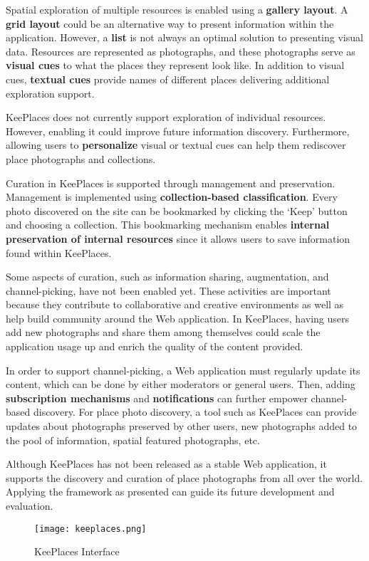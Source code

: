 {Spatial exploration of multiple resources is enabled using a \textbf{gallery layout}. A \textbf{grid layout} could be an alternative way to present information within the application. However, a \textbf{list} is not always an optimal solution to presenting visual data. 
Resources are represented as photographs, and these photographs serve as \textbf{visual cues} to what the places they represent look like. In addition to visual cues, \textbf{textual cues} provide names of different places delivering additional exploration support.

KeePlaces does not currently support exploration of individual resources. However, enabling it could improve future information discovery. Furthermore, allowing users to \textbf{personalize} visual or textual cues can help them rediscover place photographs and collections. 

\pagebreak

Curation in KeePlaces is supported through management and preservation. Management is implemented using \textbf{collection-based classification}.
Every photo discovered on the site can be bookmarked by clicking the `Keep' button and choosing a collection. This bookmarking mechanism enables \textbf{internal preservation of internal resources} since it allows users to save information found within KeePlaces. 

Some aspects of curation, such as information sharing, augmentation, and channel-picking, have not been enabled yet. These activities are important because they contribute to collaborative and creative environments as well as help build community around the Web application. In KeePlaces, having users add new photographs and share them among themselves could scale the application usage up and enrich the quality of the content provided.

In order to support channel-picking, a Web application must regularly update its content, which can be done by either moderators or general users. Then, adding \textbf{subscription mechanisms} and \textbf{notifications} can further empower channel-based discovery.  For place photo discovery, a tool such as KeePlaces can provide updates about photographs preserved by other users, new photographs added to the pool of information, spatial featured photographs, etc.

Although KeePlaces has not been released as a stable Web application, it supports the discovery and curation of place photographs from all over the world. Applying the framework as presented can guide its future development and evaluation.  

\begin{figure}[ht!]
	\noindent
	\centering
	\texttt{[image: keeplaces.png]}
	\caption{KeePlaces Interface}
	\label{fig:keeplaces} 
\end{figure}

} %

